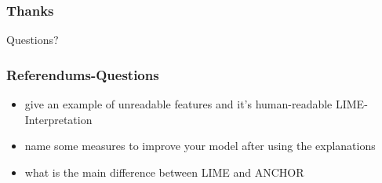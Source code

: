 \begin{frame}
	\frametitle{Thanks}
	\begin{Huge}
		\begin{center}
			Questions?
		\end{center}
	\end{Huge}
\end{frame}

\begin{frame}
	\frametitle{Referendums-Questions}
	\begin{LARGE}
		\begin{itemize}
			\item give an example of unreadable features and it's human-readable LIME-Interpretation
			\item name some measures to improve your model after using the explanations
			\item what is the main difference between LIME and ANCHOR
		\end{itemize}
	\end{LARGE}
\end{frame}